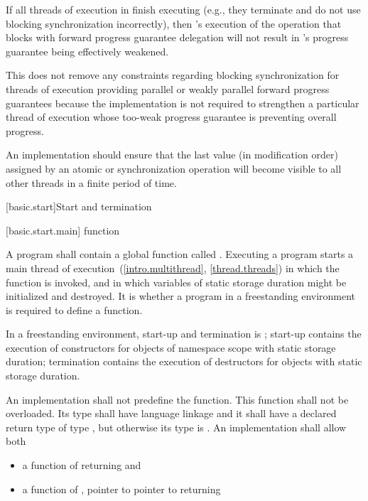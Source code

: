 \pnum
\begin{note}
If all threads of execution in  finish executing (e.g., they terminate
and do not use blocking synchronization incorrectly), then 's execution
of the operation that blocks with forward progress guarantee delegation will not
result in 's progress guarantee being effectively weakened.
\end{note}

\pnum
\begin{note}
This does not remove any constraints regarding blocking synchronization for
threads of execution providing parallel or weakly parallel forward progress
guarantees because the implementation is not required to strengthen a particular
thread of execution whose too-weak progress guarantee is preventing overall progress.
\end{note}

\pnum
An implementation should ensure that the last value (in modification order)
assigned by an atomic or synchronization operation will become visible to all
other threads in a finite period of time.%
%

[basic.start]{Start and termination}

[basic.start.main]{ function}

\pnum
{}%
A program shall contain a global function called .
Executing a program starts a main thread of execution~(\ref{intro.multithread}, \ref{thread.threads})
in which the  function is invoked,
and in which variables of static storage duration
might be initialized and destroyed.
It is 
whether a program in a freestanding environment is required to define a 
function. \begin{note} In a freestanding environment, start-up and termination is
; start-up contains the
execution of constructors for objects of namespace scope with static storage duration;
termination contains the execution of destructors for objects with static storage
duration. \end{note}

\pnum
An implementation shall not predefine the  function. This
function shall not be overloaded.  Its type shall have \Cpp{} language linkage
and it shall have a declared return type of type
, but otherwise its type is .
%
An implementation shall allow both
\begin{itemize}
\item a function of \tcode{()} returning  and
\item a function of , pointer to pointer to  returning 
\end{itemize}

